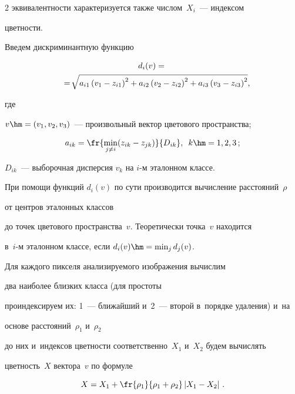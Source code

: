 \begin{multicols}{2}
эквивалентности характеризуется также чис\-лом~$X_{i}$~--- индексом

цветности.



Введем дискриминантную функцию

\begin{multline*}

    d_{i}(v)={}\\

    {}=\!\sqrt{a_{i1}\left(v_1-z_{i1}\right)^2+a_{i2}\left(v_2-z_{i2}\right)^2+

    a_{i3}\left(v_3-z_{i3}\right)^2},\hspace*{-7.9pt}

\end{multline*}

где

$v\hm=(v_1,v_2,v_3)$~--- произвольный вектор цветового пространства;

$$

a_{ik}=\fr{\min_{j \neq i}(z_{ik}-z_{jk})}{D_{ik}},\enskip k\hm=1,2,3\,;$$

$D_{ik}$~--- выборочная дисперсия $v_k$ на $i$-м эталонном классе.





При помощи функций $d_i(v)$ по сути производится вычисление расстояний~$\rho$ 

от центров эталонных классов

до точек цветового пространства~$v$. Теоретически точка~$v$ находится 

в~$i$-м эталонном классе, если $d_i(v)\hm=\min_{j}d_j(v)$.



Для каждого пикселя анализируемого изображения вычислим 

два наиболее близких класса (для простоты

проиндексируем их: 1~--- ближайший и~2~--- второй в~порядке удаления) и~на 

основе расстояний~$\rho_1$ и~$\rho_2$

до них и~индексов цветности соответственно~$X_1$ и~$X_2$ будем вычислять 

цветность~$X$ вектора~$v$ по формуле

\begin{equation*}

    X=X_1+\fr{\rho_1}{\rho_1+\rho_2}\left|X_1-X_2\right|\,.

\end{equation*}




\end{multicols}
